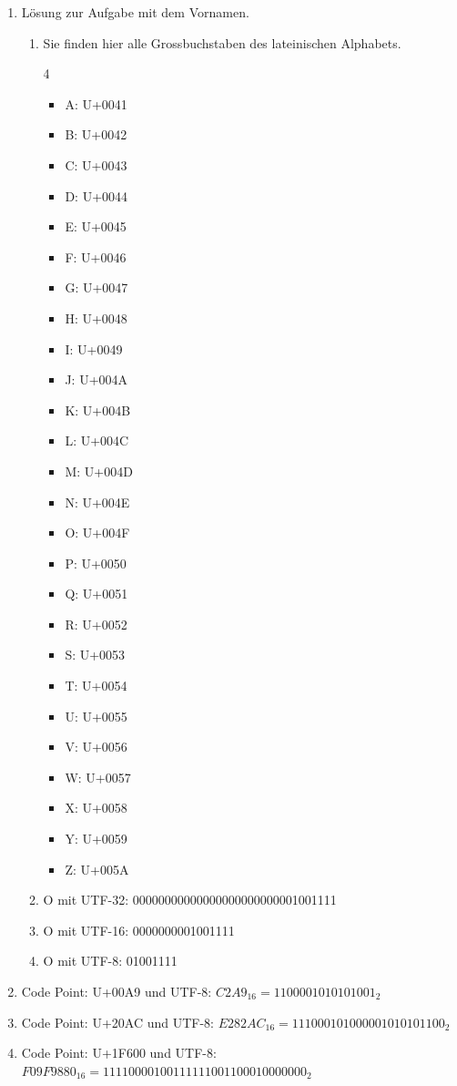 \begin{enumerate}
\item Lösung zur Aufgabe mit dem Vornamen.
\begin{enumerate}
\item Sie finden hier alle Grossbuchstaben des lateinischen Alphabets.
\begin{multicols}{4}
\begin{itemize}
\item A: U+0041
\item B: U+0042
\item C: U+0043
\item D: U+0044
\item E: U+0045
\item F: U+0046
\item G: U+0047
\item H: U+0048
\item I: U+0049
\item J: U+004A
\item K: U+004B
\item L: U+004C
\item M: U+004D
\item N: U+004E
\item O: U+004F
\item P: U+0050
\item Q: U+0051
\item R: U+0052
\item S: U+0053
\item T: U+0054
\item U: U+0055
\item V: U+0056
\item W: U+0057
\item X: U+0058
\item Y: U+0059
\item Z: U+005A
\end{itemize}
\end{multicols}
\item O mit UTF-32: 00000000000000000000000001001111
\item O mit UTF-16: 0000000001001111
\item O mit UTF-8: 01001111
\end{enumerate}
\item Code Point: U+00A9 und UTF-8: $C2A9_{16} = 1100001010101001_2$
\item Code Point: U+20AC und UTF-8: $E282AC_{16} = 111000101000001010101100_2$
\item Code Point: U+1F600 und UTF-8: $F09F9880_{16} = 11110000100111111001100010000000_2$

\end{enumerate}
